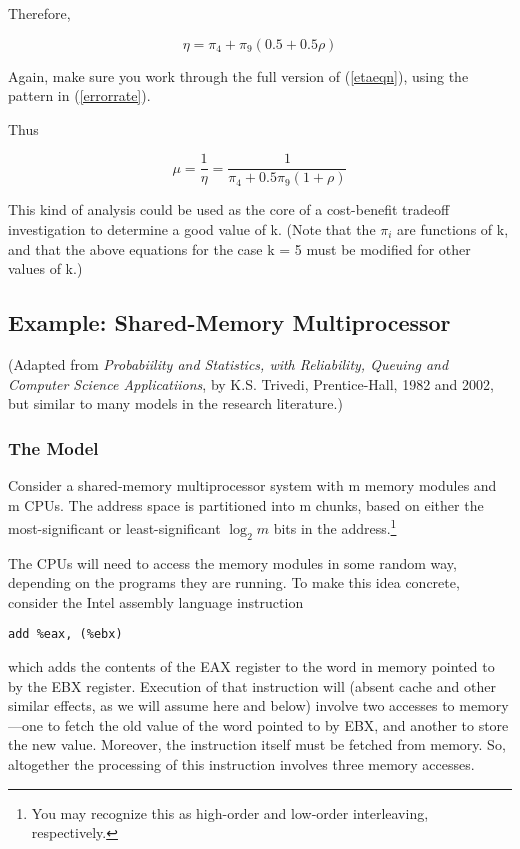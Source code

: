Therefore,

\begin{equation}
\label{etaeqn}
\eta = \pi_{4}+\pi_{9}(0.5+0.5\rho )
\end{equation}

Again, make sure you work through the full version of (\ref{etaeqn}),
using the pattern in (\ref{errorrate}).

Thus

\begin{equation}
\mu =\frac{1}{\eta} = \frac{1}{\pi_{4}+0.5\pi_{9}(1+\rho )}
\end{equation}


This kind of analysis could be used as the core of a cost-benefit
tradeoff investigation to determine a good value of k. (Note that the
$\pi_{i}$ are functions of k, and that the above equations for the case
k = 5 must be modified for other values of k.)

\subsection{Example:  Shared-Memory Multiprocessor}

(Adapted from \textit{Probabiility and Statistics, with Reliability, Queuing
and Computer Science Applicatiions}, by K.S. Trivedi, Prentice-Hall,
1982 and 2002, but similar to many models in the research literature.)

\subsubsection{The Model}

Consider a shared-memory multiprocessor system with m memory modules and
m CPUs.  The address space is partitioned into m chunks, based on either
the most-significant or least-significant $\log_2m$ bits in the
address.\footnote{You may recognize this as high-order and
low-order interleaving, respectively.} 

The CPUs will need to access the memory modules in some random way,
depending on the programs they are running.  To make this idea concrete,
consider the Intel assembly language instruction

\begin{verbatim}
add %eax, (%ebx)
\end{verbatim}

which adds the contents of the EAX register to the word in memory
pointed to by the EBX register.  Execution of that instruction will
(absent cache and other similar effects, as we will assume here and
below) involve two accesses to memory---one to fetch the old value of
the word pointed to by EBX, and another to store the new value.
Moreover, the instruction itself must be fetched from memory.  So,
altogether the processing of this instruction involves three memory
accesses.

